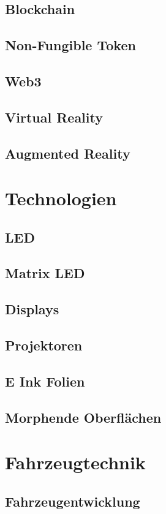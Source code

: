 \subsection{Blockchain}

\subsection{Non-Fungible Token}
\subsection{Web3}
\subsection{Virtual Reality}
\subsection{Augmented Reality}
\section{Technologien}
\subsection{LED}
\subsection{Matrix LED}
\subsection{Displays}
\subsection{Projektoren}
\subsection{E Ink Folien}
\subsection{Morphende Oberflächen}
\section{Fahrzeugtechnik}
\subsection{Fahrzeugentwicklung}

